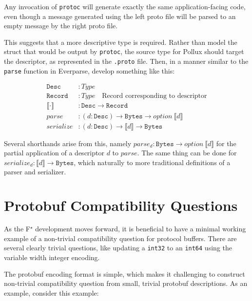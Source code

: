 \documentclass[11pt]{article}
\newcommand{\fstar}{F\(^\star\)}
\theoremstyle{definition}
\begin{document}
Any invocation of \texttt{protoc} will generate exactly the same
application-facing code, even though a message generated using the left proto
file will be parsed to an empty message by the right proto file.

This suggests that a more descriptive type is required. Rather than model the
struct that would be output by \texttt{protoc}, the source type for Pollux
should target the descriptor, as represented in the \texttt{.proto} file. Then,
in a manner similar to the \texttt{parse} function in Everparse, develop
something like this:

\begin{align*}
	\mathtt{Desc}               & : Type                                                                             \\
	\mathtt{Record}             & : Type \quad \text{Record corresponding to descriptor}                             \\
	\llbracket \cdot \rrbracket & : \mathtt{Desc} \rightarrow \mathtt{Record}                                        \\
	parse                       & : (d:\mathtt{Desc}) \rightarrow \mathtt{Bytes} \rightarrow option\
	\llbracket d \rrbracket                                                                                          \\
	serialize                   & : (d:\mathtt{Desc}) \rightarrow \llbracket d \rrbracket \rightarrow \mathtt{Bytes}
\end{align*}

Several shorthands arise from this, namely $parse_d : \mathtt{Bytes} \rightarrow option\
	\llbracket d \rrbracket$ for the partial application of a descriptor $d$ to
$parse$. The same thing can be done for $serialize_d : \llbracket d \rrbracket \rightarrow
	\mathtt{Bytes}$, which naturally to more traditional definitions of a parser and serializer.

\section{Protobuf Compatibility Questions}

As the \fstar{} development moves forward, it is beneficial to have a minimal
working example of a non-trivial compatibility question for protocol
buffers. There are several clearly trivial questions, like updating a
\texttt{int32} to an \texttt{int64} using the variable width integer encoding.

The protobuf encoding format is simple, which makes it challenging to construct
non-trivial compatibility question from small, trivial protobuf descriptions. As
an example, consider this example:
\end{document}
